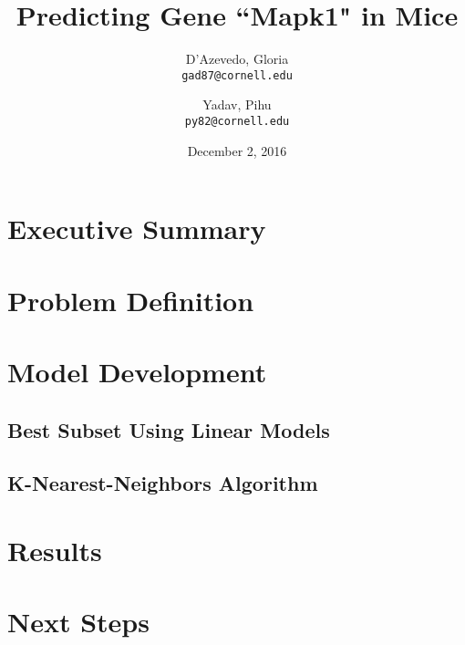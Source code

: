 \documentclass[letterpaper]{article}
\title{Predicting Gene ``Mapk1" in Mice}
\author{
  D'Azevedo, Gloria\\
  \texttt{gad87@cornell.edu}
  \and
  Yadav, Pihu\\
  \texttt{py82@cornell.edu}
}
\date{December 2, 2016}
\begin{document}
\maketitle

\section{Executive Summary}

\section{Problem Definition}

\section{Model Development}

\subsection{Best Subset Using Linear Models}

\subsection{K-Nearest-Neighbors Algorithm}

\section{Results}

\section{Next Steps}
\end{document}
